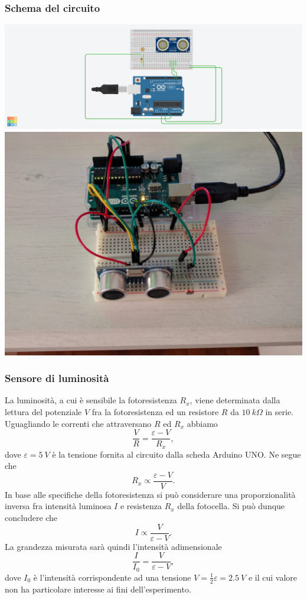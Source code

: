 \documentclass[11pt]{article}
\makeatletter
\def\maxwidth{\ifdim\Gin@nat@width>\linewidth\linewidth
    \else\Gin@nat@width\fi}
\let\Oldincludegraphics\includegraphics
\renewcommand{\includegraphics}[1]{\Oldincludegraphics[width=.8\maxwidth]{#1}}
\makeatother
\begin{document}
\hypertarget{schema-del-circuito}{%
\subsubsection{Schema del circuito}\label{schema-del-circuito}}

\includegraphics{schema.png} \includegraphics{arduino.jpeg}

\hypertarget{sensore-di-luminosituxe0}{%
\subsubsection{Sensore di luminosità}\label{sensore-di-luminosituxe0}}

La luminosità, a cui è sensibile la fotoresistenza \(R_x\), viene
determinata dalla lettura del potenziale \(V\) fra la fotoresistenza ed
un resistore \(R\) da \(10\:k\Omega\) in serie. Uguagliando le correnti
che attraversano \(R\) ed \(R_x\) abbiamo
\[\frac{V}{R}=\frac{\varepsilon-V}{R_x},\] dove \(\varepsilon=5\:V\) è
la tensione fornita al circuito dalla scheda Arduino UNO. Ne segue che
\[R_x\propto \frac{\varepsilon-V}{V}.\] In base alle specifiche della
fotoresistenza si può considerare una proporzionalità inversa fra
intensità luminosa \(I\) e resistenza \(R_x\) della fotocella. Si può
dunque concludere che \[I\propto \frac{V}{\varepsilon-V}.\] La grandezza
misurata sarà quindi l'intensità adimensionale
\[\frac{I}{I_0}=\frac{V}{\varepsilon-V},\] dove \(I_0\) è l'intensità
corrispondente ad una tensione \(V=\frac{1}{2}\varepsilon=2.5\:V\) e il
cui valore non ha particolare interesse ai fini dell'esperimento.
\end{document}
